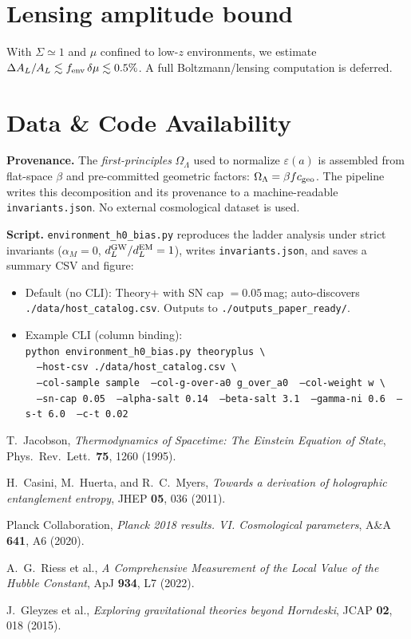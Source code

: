 \documentclass[aps,prd,preprint,onecolumn,longbibliography,nofootinbib]{revtex4-2}
\theoremstyle{plain}
\theoremstyle{remark}
\newcommand{\OmL}{\Omega_\Lambda}
\newcommand{\alM}{\alpha_{\!M}}
\newcommand{\be}{\beta}
\newcommand{\Sig}{\Sigma} %
\newcommand{\eps}{\varepsilon}
\begin{document}
\section{Lensing amplitude bound}
With $\Sig\simeq 1$ and $\mu$ confined to low-$z$ environments, we estimate $\Delta A_L/A_L \lesssim f_{\rm env}\,\delta\mu \lesssim 0.5\%$. A full Boltzmann/lensing computation is deferred.

\section*{Data \& Code Availability}
\textbf{Provenance.} The \emph{first-principles} $\OmL$ used to normalize $\eps(a)$ is assembled from flat-space $\be$ and pre-committed geometric factors: $\OmL=\be f c_{\rm geo}$. The pipeline writes this decomposition and its provenance to a machine-readable \texttt{invariants.json}. No external cosmological dataset is used.

\textbf{Script.} \texttt{environment\_h0\_bias.py} reproduces the ladder analysis under strict invariants ($\alM=0$, $d_L^{\rm GW}/d_L^{\rm EM}=1$), writes \texttt{invariants.json}, and saves a summary CSV and figure:
\begin{itemize}
\item Default (no CLI): Theory+ with SN cap $=0.05$\,mag; auto-discovers \texttt{./data/host\_catalog.csv}. Outputs to \texttt{./outputs\_paper\_ready/}.
\item Example CLI (column binding):\\
\texttt{python environment\_h0\_bias.py theoryplus \textbackslash}\\
\texttt{\ \ --host-csv ./data/host\_catalog.csv \textbackslash}\\
\texttt{\ \ --col-sample sample \ --col-g-over-a0 g\_over\_a0 \ --col-weight w \textbackslash}\\
\texttt{\ \ --sn-cap 0.05 \ --alpha-salt 0.14 \ --beta-salt 3.1 \ --gamma-ni 0.6 \ --s-t 6.0 \ --c-t 0.02}
\end{itemize}

\begin{thebibliography}{99}

T.~Jacobson, \emph{Thermodynamics of Spacetime: The Einstein Equation of State}, Phys.\ Rev.\ Lett.\ \textbf{75}, 1260 (1995).

H.~Casini, M.~Huerta, and R.~C.~Myers, \emph{Towards a derivation of holographic entanglement entropy}, JHEP \textbf{05}, 036 (2011).

Planck Collaboration, \emph{Planck 2018 results. VI. Cosmological parameters}, A\&A \textbf{641}, A6 (2020).

A.~G.~Riess et al., \emph{A Comprehensive Measurement of the Local Value of the Hubble Constant}, ApJ \textbf{934}, L7 (2022).

J.~Gleyzes et al., \emph{Exploring gravitational theories beyond Horndeski}, JCAP \textbf{02}, 018 (2015).

\end{thebibliography}
\end{document}
